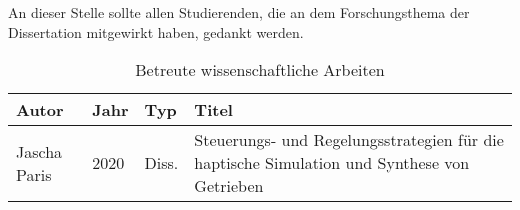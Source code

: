 
\label{sec:WissArbeiten}

An dieser Stelle sollte allen Studierenden, die an dem Forschungsthema der Dissertation mitgewirkt haben, gedankt werden.

\begin{table}[h]
	\centering
	\caption{Betreute wissenschaftliche Arbeiten}
	\label{tab:BetreuteWissenschaftlicheArbeiten}
	\begin{tabular}{lll>{\raggedright\arraybackslash}p{9cm}}
		\toprule
		Autor            & Jahr & Typ   & Titel                                                                                                                                                                              \\ \midrule
		Jascha Paris     & 2020 & Diss. & Steuerungs- und Regelungsstrategien für die haptische Simulation und Synthese von Getrieben \\
		\bottomrule
	\end{tabular}
\end{table}
